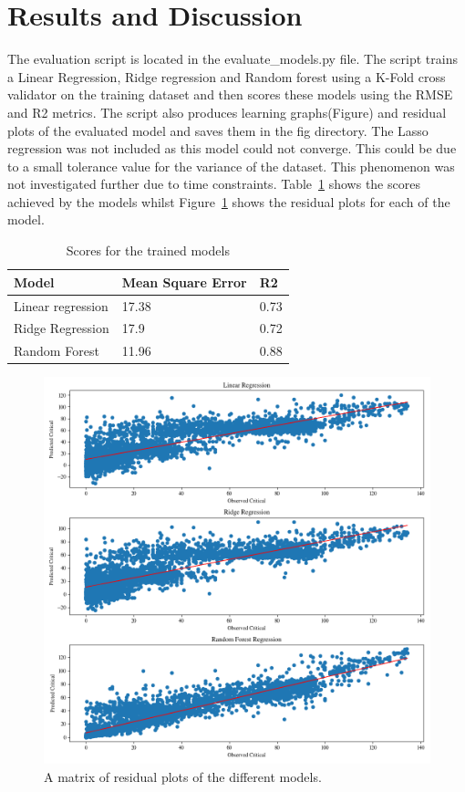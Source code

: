 \documentclass{article}
\begin{document}
\section{Results and Discussion}
The evaluation script is located in the evaluate\_models.py file. The script trains a Linear Regression, Ridge regression and Random forest using a K-Fold cross validator on the training dataset and then scores these models using the RMSE and R2 metrics. The script also produces learning graphs(Figure) and residual plots of the evaluated model and saves them in the fig directory. The Lasso regression was not included as this model could not converge. This could be due to a small tolerance value for the variance of the dataset. This phenomenon was not investigated further due to time constraints. Table~\ref{tab:scores} shows the scores achieved by the models whilst Figure~\ref{fig:residual} shows the residual plots for each of the model.

\begin{table}[]
\centering
\begin{tabular}{@{}lll@{}}
\toprule
Model             & Mean Square Error & R2   \\ \midrule
Linear regression & 17.38             & 0.73 \\
Ridge Regression  & 17.9              & 0.72 \\
Random Forest     & 11.96             & 0.88 \\ \bottomrule
\end{tabular}
\caption{Scores for the trained models}
\label{tab:scores}
\end{table}

\begin{figure}[H]
\label{fig:residual}
  \centering
    \includegraphics[scale=0.55]{images/residual.png}
    \caption{A matrix of residual plots of the different models.}
\end{figure}
\end{document}
